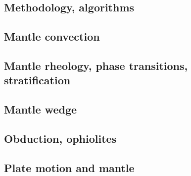 \cite{yatd12}

\subsection*{Methodology, algorithms}

\cite{leka93}

\subsection*{Mantle convection}

\cite{hemw75}
\cite{ludt79}
\cite{olco80}\cite{jamc80}
\cite{jape82}\cite{homc82}
\cite{hous83}\cite{hous83b}
\cite{olyb84}\cite{jarv84}\cite{haeb84}\cite{harp84}
\cite{jarv85}
\cite{yuqh87}
\cite{zhch93}\cite{jarv93}
\cite{haeb94}
\cite{zhgu95}
\cite{zhyu96}\cite{hond96}
\cite{hond97}\cite{iwho97}
\cite{ande98}\cite{iwho98}
\cite{albe00}\cite{hayu00}
\cite{zhzm00}
\cite{hapa03}
\cite{nake07}
\cite{lowm11}
\cite{holj13}
\cite{arfw14}\cite{helo14}

\subsection*{Mantle rheology, phase transitions, stratification}

\cite{yusb82}
\cite{zhyh92}
\cite{zhyu95}
\cite{java11}

\subsection*{Mantle wedge}

\cite{leki09}
\cite{ledg14}

\subsection*{Obduction, ophiolites}

\cite{hack90}
\cite{hack91}
\cite{agzf14}

\subsection*{Plate motion and mantle}

